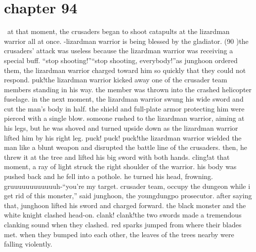 \section{chapter 94}






 at that moment, the crusaders began to shoot catapults at the lizardman warrior all at once.
-lizardman warrior is being blessed by the gladiator.
 (90%
)the crusaders’ attack was useless because the lizardman warrior was receiving a special buff.
“stop shooting!”“stop shooting, everybody!”as junghoon ordered them, the lizardman warrior charged toward him so quickly that they could not respond.
puk!the lizardman warrior kicked away one of the crusader team members standing in his way.
 the member was thrown into the crashed helicopter fuselage.
in the next moment, the lizardman warrior swung his wide sword and cut the man’s body in half.
 the shield and full-plate armor protecting him were pierced with a single blow.
someone rushed to the lizardman warrior, aiming at his legs, but he was shoved and turned upside down as the lizardman warrior lifted him by his right leg.
puck! puck! puck!the lizardman warrior wielded the man like a blunt weapon and disrupted the battle line of the crusaders.
 then, he threw it at the tree and lifted his big sword with both hands.
cling!at that moment, a ray of light struck the right shoulder of the warrior.
 his body was pushed back and he fell into a pothole.
 he turned his head, frowning.
gruuuuuuuuuuuuh-“you’re my target.
 crusader team, occupy the dungeon while i get rid of this monster,” said junghoon, the youngdungpo prosecutor.
 after saying that, junghoon lifted his sword and charged forward.
the black monster and the white knight clashed head-on.
clank! clank!the two swords made a tremendous clanking sound when they clashed.
 red sparks jumped from where their blades met.
 when they bumped into each other, the leaves of the trees nearby were falling violently.

